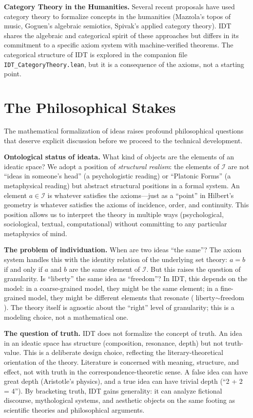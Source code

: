 \documentclass[11pt,openany]{book}
\theoremstyle{definition}
\theoremstyle{plain}
\theoremstyle{remark}
\newcommand{\IS}{\mathcal{I}}               %
\newcommand{\res}{\sim}                      %
\begin{document}
\textbf{Category Theory in the Humanities.} Several recent proposals have used category theory to formalize concepts in the humanities (Mazzola's topos of music, Goguen's algebraic semiotics, Spivak's applied category theory). IDT shares the algebraic and categorical spirit of these approaches but differs in its commitment to a specific axiom system with machine-verified theorems. The categorical structure of IDT is explored in the companion file \texttt{IDT\_CategoryTheory.lean}, but it is a consequence of the axioms, not a starting point.

\section{The Philosophical Stakes}

The mathematical formalization of ideas raises profound philosophical questions that deserve explicit discussion before we proceed to the technical development.

\textbf{Ontological status of ideata.} What kind of objects are the elements of an ideatic space? We adopt a position of \emph{structural realism}: the elements of $\IS$ are not ``ideas in someone's head'' (a psychologistic reading) or ``Platonic Forms'' (a metaphysical reading) but abstract structural positions in a formal system. An element $a \in \IS$ is whatever satisfies the axioms---just as a ``point'' in Hilbert's geometry is whatever satisfies the axioms of incidence, order, and continuity. This position allows us to interpret the theory in multiple ways (psychological, sociological, textual, computational) without committing to any particular metaphysics of mind.

\textbf{The problem of individuation.} When are two ideas ``the same''? The axiom system handles this with the identity relation of the underlying set theory: $a = b$ if and only if $a$ and $b$ are the same element of $\IS$. But this raises the question of granularity. Is ``liberty'' the same idea as ``freedom''? In IDT, this depends on the model: in a coarse-grained model, they might be the same element; in a fine-grained model, they might be different elements that resonate ($\text{liberty} \res \text{freedom}$). The theory itself is agnostic about the ``right'' level of granularity; this is a modeling choice, not a mathematical one.

\textbf{The question of truth.} IDT does not formalize the concept of truth. An idea in an ideatic space has structure (composition, resonance, depth) but not truth-value. This is a deliberate design choice, reflecting the literary-theoretical orientation of the theory. Literature is concerned with meaning, structure, and effect, not with truth in the correspondence-theoretic sense. A false idea can have great depth (Aristotle's physics), and a true idea can have trivial depth (``2 + 2 = 4''). By bracketing truth, IDT gains generality: it can analyze fictional discourse, mythological systems, and aesthetic objects on the same footing as scientific theories and philosophical arguments.
\end{document}
